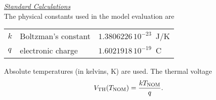 \noindent\underline{\sl \large Standard Calculations}\\[0.1in]
The physical constants used in the model evaluation are
\begin{center}
\begin{tabular}{|l|l|l|}
\hline
$k$ & Boltzman's constant           &  $1.3806226\,10^{-23}$~J/K\\
$q$ & electronic charge             & $1.6021918\,10^{-19}$~C\\
\hline
\end{tabular}
\end{center}
Absolute temperatures (in kelvins, K) are used.
The thermal voltage
\begin{equation}
V_{\mbox{\scriptsize TH}}(T_{\mbox{\scriptsize NOM}}) = {{kT_{\mbox{\scriptsize NOM}}} \over q} .
\end{equation}

